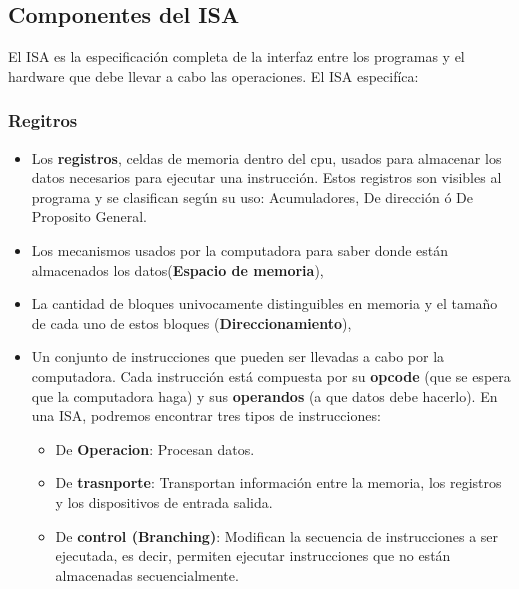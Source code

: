 \subsection{Componentes del ISA}
El ISA es la especificación completa de la interfaz entre los programas y el hardware que debe llevar a cabo las operaciones. El ISA especifíca:

\subsubsection{Regitros}
\begin{itemize}
	\item Los \textbf{registros},  celdas de memoria dentro del cpu, usados para almacenar los datos necesarios para ejecutar una instrucción. Estos registros son visibles al programa y se clasifican según su uso: Acumuladores, De dirección ó De Proposito General.
	\item Los mecanismos usados por la computadora para saber donde están almacenados los datos(\textbf{Espacio de memoria}), 
	\item La cantidad de bloques univocamente distinguibles en memoria y el tamaño de cada uno de estos bloques (\textbf{Direccionamiento}),
	\item  Un conjunto de instrucciones  que pueden ser llevadas a cabo por la computadora. Cada instrucción está compuesta por su \textbf{opcode} (que se espera que la computadora haga) y sus \textbf{operandos} (a que datos debe hacerlo). En una ISA, podremos encontrar tres tipos de instrucciones:
	\begin{itemize}
		\item De \textbf{Operacion}: Procesan datos.
		\item De \textbf{trasnporte}: Transportan información entre la memoria, los registros y los dispositivos de entrada salida.
		\item De \textbf{control (Branching)}: Modifican la secuencia de instrucciones a ser ejecutada, es decir, permiten ejecutar instrucciones que no están almacenadas secuencialmente.
	\end{itemize}
	

\end{itemize}
